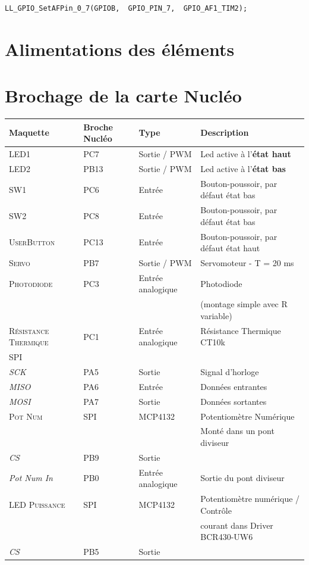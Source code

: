 \documentclass[a4paper,11pt,titlepage]{article} %
\begin{document}
\begin{lstlisting}
LL_GPIO_SetAFPin_0_7(GPIOB,  GPIO_PIN_7,  GPIO_AF1_TIM2);
\end{lstlisting}


\section{Alimentations des éléments}




\section{Brochage de la carte Nucléo}
\begin{center}

\begin{tabular}{|l|l|l|l|}
\hline 
Maquette & \textbf{Broche Nucléo} & Type & Description \\ 
\hline 
\textsc{LED1} & PC7 & Sortie / PWM & Led active à l'\textbf{état haut}\\ 
\textsc{LED2} & PB13 & Sortie / PWM & Led active à l'\textbf{état bas}\\ 
\hline 
\textsc{SW1} & PC6 & Entrée & Bouton-poussoir, par défaut état bas\\ 
\textsc{SW2} & PC8 & Entrée & Bouton-poussoir, par défaut état bas\\ 
\textsc{UserButton} & PC13 & Entrée & Bouton-poussoir, par défaut état haut\\
\hline 
\textsc{Servo} & PB7 & Sortie / PWM & Servomoteur - T = 20 ms\\ 
\hline 
\textsc{Photodiode} & PC3 & Entrée analogique & Photodiode \\
 & & & (montage simple avec R variable)\\ 
\hline 
\textsc{Résistance Thermique} & PC1 & Entrée analogique & Résistance Thermique CT10k\\ 
\hline 
\textsc{SPI} & & & \\ 
\textit{SCK} & PA5 & Sortie & Signal d'horloge\\
\textit{MISO} & PA6 & Entrée & Données entrantes\\
\textit{MOSI} & PA7 & Sortie & Données sortantes\\
\hline 
\textsc{Pot Num} & SPI & MCP4132 & Potentiomètre Numérique\\ 
 & & & Monté dans un pont diviseur\\ 
\textit{CS} & PB9 & Sortie & \\ 
\textit{Pot Num In} & PB0 & Entrée analogique & Sortie du pont diviseur\\ 
\hline 
\textsc{LED Puissance} & SPI & MCP4132 & Potentiomètre numérique / Contrôle\\ 
 & & & courant dans Driver BCR430-UW6\\ 
\textit{CS} & PB5 & Sortie & \\

\hline 
\end{tabular} 

\end{center}
\end{document}
